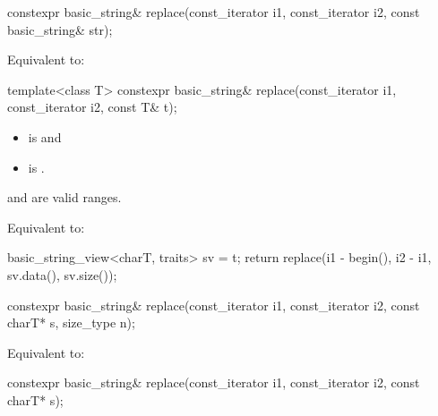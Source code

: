 %
\begin{itemdecl}
constexpr basic_string& replace(const_iterator i1, const_iterator i2, const basic_string& str);
\end{itemdecl}

\begin{itemdescr}
\pnum
\effects
Equivalent to: 
\end{itemdescr}

%
\begin{itemdecl}
template<class T>
  constexpr basic_string& replace(const_iterator i1, const_iterator i2, const T& t);
\end{itemdecl}

\begin{itemdescr}
\pnum
\constraints
\begin{itemize}
\item
{} is
 and
\item
{} is
.
\end{itemize}

\pnum
\expects
{} and  are valid ranges.

\pnum
\effects
Equivalent to:
\begin{codeblock}
basic_string_view<charT, traits> sv = t;
return replace(i1 - begin(), i2 - i1, sv.data(), sv.size());
\end{codeblock}
\end{itemdescr}

%
\begin{itemdecl}
constexpr basic_string& replace(const_iterator i1, const_iterator i2, const charT* s, size_type n);
\end{itemdecl}

\begin{itemdescr}
\pnum
\effects
Equivalent to: 
\end{itemdescr}

%
\begin{itemdecl}
constexpr basic_string& replace(const_iterator i1, const_iterator i2, const charT* s);
\end{itemdecl}

